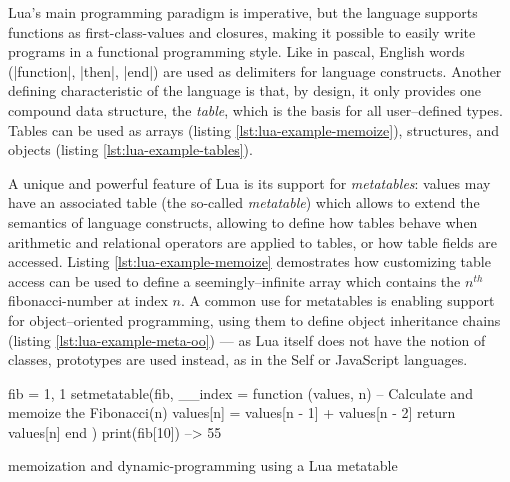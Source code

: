 Lua's main programming paradigm is imperative, but the language supports
functions as \glspl{first-class-value} and \glspl{closure}, making it possible
to easily write programs in a functional programming style. Like in
\gls{pascal}, English words (\Mlua|function|, \Mlua|then|, \Mlua|end|) are
used as delimiters for language constructs. Another defining characteristic of
the language is that, by design, it only provides one compound data structure,
the \emph{table}, which is the basis for all user--defined types. Tables can
be used as arrays (listing \ref{lst:lua-example-memoize}), structures, and
objects (listing \ref{lst:lua-example-tables}).

A unique and powerful feature of Lua is its support for \emph{metatables}:
values may have an associated table (the so-called \emph{metatable}) which
allows to extend the semantics of language constructs, allowing to define how
tables behave when arithmetic and relational operators are applied to tables,
or how table fields are accessed. Listing \vref{lst:lua-example-memoize}
demostrates how customizing table access can be used to define a
seemingly--infinite array which contains the $n^{th}$ \gls{fibonacci-number}
at index $n$. A common use for metatables is enabling support for
object--oriented programming, using them to define object inheritance chains
(listing \ref{lst:lua-example-meta-oo}) --- as Lua itself does not have the
notion of classes, prototypes are used instead, as in the Self or JavaScript
languages.

\begin{listing}
  \begin{luacode}
    fib = { 1, 1 }
    setmetatable(fib, {
      __index = function (values, n)
        -- Calculate and memoize the Fibonacci(n)
        values[n] = values[n - 1] + values[n - 2]
        return values[n]
      end
    })
    print(fib[10])  --> 55
  \end{luacode}
  \caption{\Gls{memoization} and \gls{dynamic-programming} using a Lua metatable}
	\label{lst:lua-example-memoize}
\end{listing}

